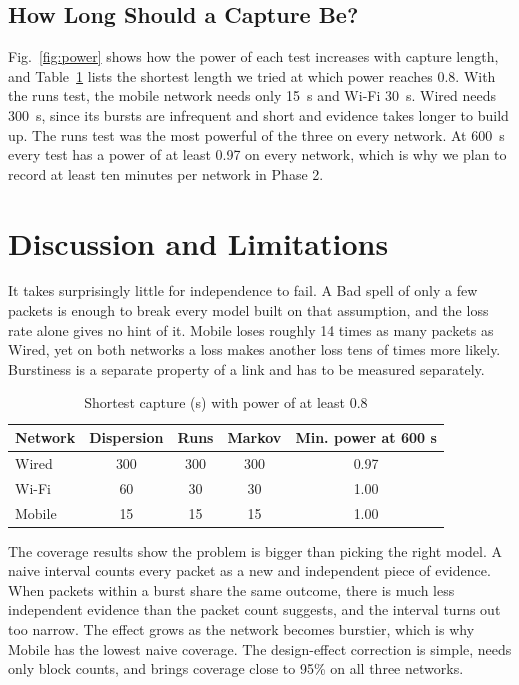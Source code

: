 \documentclass[conference]{IEEEtran}
\begin{document}
\subsection{How Long Should a Capture Be?}
Fig.~\ref{fig:power} shows how the power of each test increases with capture length, and Table~\ref{tab:power} lists the shortest length we tried at which power reaches 0.8. With the runs test, the mobile network needs only 15~s and Wi-Fi 30~s. Wired needs 300~s, since its bursts are infrequent and short and evidence takes longer to build up. The runs test was the most powerful of the three on every network. At 600~s every test has a power of at least 0.97 on every network, which is why we plan to record at least ten minutes per network in Phase 2.

\section{Discussion and Limitations}
It takes surprisingly little for independence to fail. A Bad spell of only a few packets is enough to break every model built on that assumption, and the loss rate alone gives no hint of it. Mobile loses roughly 14 times as many packets as Wired, yet on both networks a loss makes another loss tens of times more likely. Burstiness is a separate property of a link and has to be measured separately.

\begin{table}[!t]
\caption{Shortest capture (s) with power of at least 0.8}
\label{tab:power}
\centering
\footnotesize
\begin{tabular}{lcccc}
\toprule
Network & Dispersion & Runs & Markov & Min. power at 600 s \\
\midrule
Wired & 300 & 300 & 300 & 0.97 \\
Wi-Fi & 60 & 30 & 30 & 1.00 \\
Mobile & 15 & 15 & 15 & 1.00 \\
\bottomrule
\end{tabular}
\end{table}

The coverage results show the problem is bigger than picking the right model. A naive interval counts every packet as a new and independent piece of evidence. When packets within a burst share the same outcome, there is much less independent evidence than the packet count suggests, and the interval turns out too narrow. The effect grows as the network becomes burstier, which is why Mobile has the lowest naive coverage. The design-effect correction is simple, needs only block counts, and brings coverage close to 95\% on all three networks.
\end{document}
